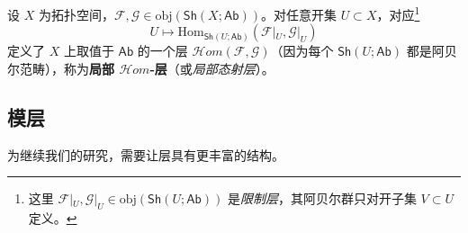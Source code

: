 \begin{Def}\label{localHomShAb}
设 $X$ 为拓扑空间，$\mathcal{F},\mathcal{G}\in\text{obj}(\mathsf{Sh}(X;\mathsf{Ab}))$。对任意开集 $U\subset X$，对应\footnote{这里 $\mathcal{F}|_U,\mathcal{G}|_U\in\text{obj}(\mathsf{Sh}(U;\mathsf{Ab}))$ 是\textit{限制层}，其阿贝尔群只对开子集 $V\subset U$ 定义。}
\begin{equation}
	U\mapsto\text{Hom}_{\mathsf{Sh}(U;\mathsf{Ab})}(\mathcal{F}|_U,\mathcal{G}|_U)
\end{equation}
定义了 $X$ 上取值于 $\mathsf{Ab}$ 的一个层 $\mathcal{H}om(\mathcal{F},\mathcal{G})$（因为每个 $\mathsf{Sh}(U;\mathsf{Ab})$ 都是阿贝尔范畴），称为\textbf{局部 $\mathcal{H}om$-层}（或\textit{局部态射层}）。
\end{Def}



\subsection{模层}\label{ch5.3}


为继续我们的研究，需要让层具有更丰富的结构。

